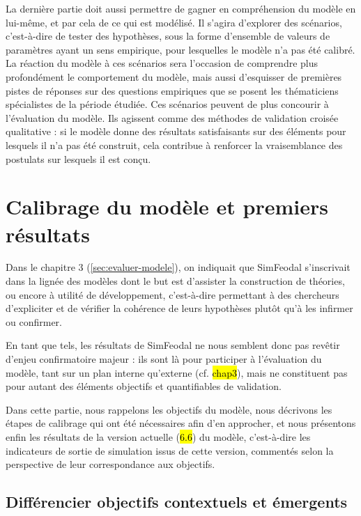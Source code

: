La dernière partie doit aussi permettre de gagner en compréhension du modèle en lui-même, et par cela de ce qui est modélisé.
Il s'agira d'explorer des \og scénarios\fg{}, c'est-à-dire de tester des hypothèses, sous la forme d'ensemble de valeurs de paramètres ayant un sens empirique, pour lesquelles le modèle n'a pas été calibré.
La réaction du modèle à ces scénarios sera l'occasion de comprendre plus profondément le comportement du modèle, mais aussi d'esquisser de premières pistes de réponses sur des questions empiriques que se posent les thématiciens spécialistes de la période étudiée.
Ces scénarios peuvent de plus concourir à l'évaluation du modèle.
Ils agissent comme des méthodes de \og validation croisée\fg{} qualitative : si le modèle donne des résultats satisfaisants sur des éléments pour lesquels il n'a pas été construit, cela contribue à renforcer la vraisemblance des postulats sur lesquels il est conçu.

\section{Calibrage du modèle et premiers résultats}

Dans le chapitre 3 (\cref{sec:evaluer-modele}), on indiquait que SimFeodal s'inscrivait dans la lignée des  modèles dont le but est d'\og assister la construction de théories\fg{}, ou encore \og à utilité de développement\fg{}, c'est-à-dire permettant à des chercheurs d'expliciter et de vérifier la cohérence de leurs hypothèses plutôt qu'à les infirmer ou confirmer.

En tant que tels, les \og résultats\fg{} de SimFeodal ne nous semblent donc pas revêtir d'enjeu confirmatoire majeur : ils sont là pour participer à l'évaluation du modèle, tant sur un plan interne qu'externe (cf. \hl{chap3}), mais ne constituent pas pour autant des éléments objectifs et quantifiables de validation.

Dans cette partie, nous rappelons les objectifs du modèle, nous décrivons les étapes de calibrage qui ont été nécessaires afin d'en approcher, et nous présentons enfin les résultats de la version actuelle (\hl{6.6}) du modèle, c'est-à-dire les indicateurs de sortie de simulation issus de cette version, commentés selon la perspective de leur correspondance aux objectifs.

\subsection{Différencier objectifs contextuels et émergents}

